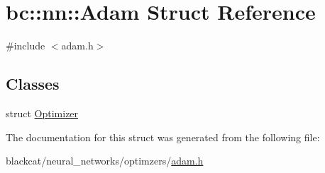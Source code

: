 \hypertarget{structbc_1_1nn_1_1Adam}{}\section{bc\+:\+:nn\+:\+:Adam Struct Reference}
\label{structbc_1_1nn_1_1Adam}


{\ttfamily \#include $<$adam.\+h$>$}

\subsection*{Classes}
\begin{DoxyCompactItemize}
\item 
struct \hyperlink{structbc_1_1nn_1_1Adam_1_1Optimizer}{Optimizer}
\end{DoxyCompactItemize}


The documentation for this struct was generated from the following file\+:\begin{DoxyCompactItemize}
\item 
blackcat/neural\+\_\+networks/optimzers/\hyperlink{adam_8h}{adam.\+h}\end{DoxyCompactItemize}

